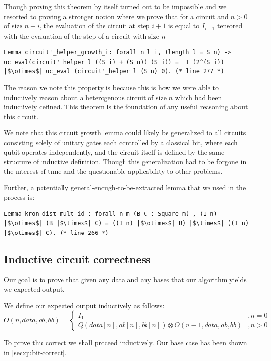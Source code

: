\documentclass{article}
\begin{document}
Though proving this theorem by itself turned out to be impossible and we resorted to proving a stronger notion where we prove that for a circuit and $n>0$ of size $n+i$, the evaluation of the circuit at step $i+1$ is equal to $I_{i+1}$ tensored with the evaluation of the  step of a circuit with size $n$
\begin{verbatim}
Lemma circuit'_helper_growth_i: forall n l i, (length l = S n) -> uc_eval(circuit'_helper l ((S i) + (S n)) (S i)) =  I (2^(S i)) |$\otimes$| uc_eval (circuit'_helper l (S n) 0). (* line 277 *)
\end{verbatim}

The reason we note this property is because this is how we were able to inductively reason about a heterogenous circuit of size $n$ which had been inductively defined.
This theorem is the foundation of any useful reasoning about this circuit.

We note that this circuit growth lemma could likely be generalized to all circuits consisting solely of unitary gates each controlled by a classical bit, where each qubit operates independently, and the circuit itself is defined by the same structure of inductive definition. 
Though this generalization had to be forgone in the interest of time and the questionable applicability to other problems.

Further, a potentially general-enough-to-be-extracted lemma that we used in the process is:
\begin{verbatim}
Lemma kron_dist_mult_id : forall n m (B C : Square m) , (I n) |$\otimes$| (B |$\times$| C) = ((I n) |$\otimes$| B) |$\times$| ((I n) |$\otimes$| C). (* line 266 *)
\end{verbatim}
\subsection{Inductive circuit correctness}\label{sec:circuit-correct}
Our goal is to prove that given any data and any bases that our algorithm yields we expected output.

We define our expected output inductively as follows:
$$O(n,data,ab,bb) = \begin{cases}I_1&,n=0\\ Q(data[n],ab[n],bb[n]) \otimes O(n-1, data, ab,bb)&, n>0\end{cases}$$

To prove this correct we shall proceed inductively. Our base case has been shown in \cref{sec:qubit-correct}.
\end{document}
